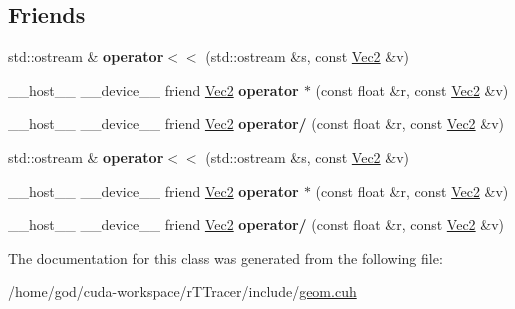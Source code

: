 \subsection*{Friends}
\begin{DoxyCompactItemize}
\item 
std\+::ostream \& {\bfseries operator$<$$<$} (std\+::ostream \&s, const \hyperlink{class_vec2}{Vec2} \&v)\hypertarget{class_vec2_a694960aa6f1e1475c532ec7682f39287}{}\label{class_vec2_a694960aa6f1e1475c532ec7682f39287}

\item 
\+\_\+\+\_\+host\+\_\+\+\_\+ \+\_\+\+\_\+device\+\_\+\+\_\+ friend \hyperlink{class_vec2}{Vec2} {\bfseries operator $\ast$} (const float \&r, const \hyperlink{class_vec2}{Vec2} \&v)\hypertarget{class_vec2_a85b03ac25ec19d9bb9b746474b443d17}{}\label{class_vec2_a85b03ac25ec19d9bb9b746474b443d17}

\item 
\+\_\+\+\_\+host\+\_\+\+\_\+ \+\_\+\+\_\+device\+\_\+\+\_\+ friend \hyperlink{class_vec2}{Vec2} {\bfseries operator/} (const float \&r, const \hyperlink{class_vec2}{Vec2} \&v)\hypertarget{class_vec2_ae7585370defee85ee50ac0ccb82f5e49}{}\label{class_vec2_ae7585370defee85ee50ac0ccb82f5e49}

\item 
std\+::ostream \& {\bfseries operator$<$$<$} (std\+::ostream \&s, const \hyperlink{class_vec2}{Vec2} \&v)\hypertarget{class_vec2_a694960aa6f1e1475c532ec7682f39287}{}\label{class_vec2_a694960aa6f1e1475c532ec7682f39287}

\item 
\+\_\+\+\_\+host\+\_\+\+\_\+ \+\_\+\+\_\+device\+\_\+\+\_\+ friend \hyperlink{class_vec2}{Vec2} {\bfseries operator $\ast$} (const float \&r, const \hyperlink{class_vec2}{Vec2} \&v)\hypertarget{class_vec2_a85b03ac25ec19d9bb9b746474b443d17}{}\label{class_vec2_a85b03ac25ec19d9bb9b746474b443d17}

\item 
\+\_\+\+\_\+host\+\_\+\+\_\+ \+\_\+\+\_\+device\+\_\+\+\_\+ friend \hyperlink{class_vec2}{Vec2} {\bfseries operator/} (const float \&r, const \hyperlink{class_vec2}{Vec2} \&v)\hypertarget{class_vec2_ae7585370defee85ee50ac0ccb82f5e49}{}\label{class_vec2_ae7585370defee85ee50ac0ccb82f5e49}

\end{DoxyCompactItemize}


The documentation for this class was generated from the following file\+:\begin{DoxyCompactItemize}
\item 
/home/god/cuda-\/workspace/r\+T\+Tracer/include/\hyperlink{r_t_tracer_2include_2geom_8cuh}{geom.\+cuh}\end{DoxyCompactItemize}
